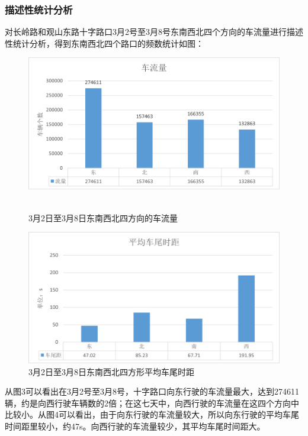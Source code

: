 \documentclass[UTF8]{article}
\begin{document}
    \subsubsection{描述性统计分析}
        对长岭路和观山东路十字路口3月2号至3月8号东南西北四个方向的车流量进行描述性统计分析，得到东南西北四个路口的频数统计如图：\\
        \begin{figure}[H]
            \includegraphics[width=\linewidth]{3.png}\
            \caption{3月2日至3月8日东南西北四方向的车流量}
            \label{fig:f3}
        \end{figure}
        \begin{figure}[H]
            \includegraphics[width=\linewidth]{4.png}
            \caption{3月2日至3月8日东南西北四方形平均车尾时距}
            \label{fig:f4}
        \end{figure}
        从图3可以看出在3月2号至3月8号，十字路口向东行驶的车流量最大，达到274611辆，约是向西行驶车辆数的2倍；在这七天中，向西行驶的车流量在这四个方向中比较小。从图4可以看出，由于向东行驶的车流量较大，所以向东行驶的平均车尾时间距里较小，约47s。向西行驶的车流量较少，其平均车尾时间距大。\\
    
\end{document}
